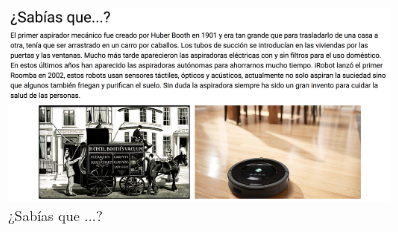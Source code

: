 \begin{figure}[H]
    \centering
    \includegraphics[width=0.9\textwidth, height=0.45\textwidth]{chapters/images/teoria4.png}
    \caption{¿Sabías que ...?}
    \label{fig:my_label}
\end{figure}


